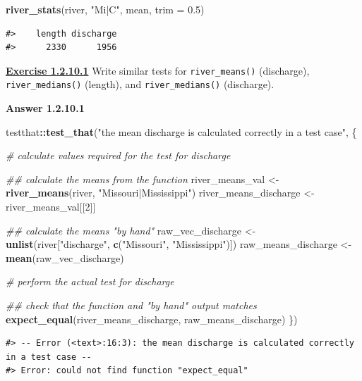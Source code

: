 \documentclass[
]{book}
\newenvironment{Shaded}{\begin{snugshade}}{\end{snugshade}}
\newcommand{\CommentTok}[1]{\textcolor[rgb]{0.56,0.35,0.01}{\textit{#1}}}
\newcommand{\DataTypeTok}[1]{\textcolor[rgb]{0.13,0.29,0.53}{#1}}
\newcommand{\DecValTok}[1]{\textcolor[rgb]{0.00,0.00,0.81}{#1}}
\newcommand{\FloatTok}[1]{\textcolor[rgb]{0.00,0.00,0.81}{#1}}
\newcommand{\KeywordTok}[1]{\textcolor[rgb]{0.13,0.29,0.53}{\textbf{#1}}}
\newcommand{\NormalTok}[1]{#1}
\newcommand{\OperatorTok}[1]{\textcolor[rgb]{0.81,0.36,0.00}{\textbf{#1}}}
\newcommand{\StringTok}[1]{\textcolor[rgb]{0.31,0.60,0.02}{#1}}
\begin{document}
\begin{Shaded}
\begin{Highlighting}[]
\KeywordTok{river_stats}\NormalTok{(river, }\StringTok{"Mi|C"}\NormalTok{, mean, }\DataTypeTok{trim =} \FloatTok{0.5}\NormalTok{)}
\end{Highlighting}
\end{Shaded}

\begin{verbatim}
#>    length discharge 
#>      2330      1956
\end{verbatim}

\textbf{\protect\hyperlink{ex-set4}{Exercise 1.2.10.1}} Write similar tests for \texttt{river\_means()} (discharge), \texttt{river\_medians()} (length), and \texttt{river\_medians()} (discharge).

\textbf{Answer 1.2.10.1}

\begin{Shaded}
\begin{Highlighting}[]
\NormalTok{testthat}\OperatorTok{::}\KeywordTok{test_that}\NormalTok{(}\StringTok{"the mean discharge is calculated correctly in a test case"}\NormalTok{, \{}
  
  \CommentTok{# calculate values required for the test for discharge}

  \CommentTok{## calculate the means from the function}
\NormalTok{  river_means_val <-}\StringTok{ }\KeywordTok{river_means}\NormalTok{(river, }\StringTok{"Missouri|Mississippi"}\NormalTok{)}
\NormalTok{  river_means_discharge <-}\StringTok{ }\NormalTok{river_means_val[[}\DecValTok{2}\NormalTok{]]}

  \CommentTok{## calculate the means "by hand"}
\NormalTok{  raw_vec_discharge <-}\StringTok{ }\KeywordTok{unlist}\NormalTok{(river[}\StringTok{"discharge"}\NormalTok{, }\KeywordTok{c}\NormalTok{(}\StringTok{"Missouri"}\NormalTok{, }\StringTok{"Mississippi"}\NormalTok{)])}
\NormalTok{  raw_means_discharge <-}\StringTok{ }\KeywordTok{mean}\NormalTok{(raw_vec_discharge)}
  
  \CommentTok{# perform the actual test for discharge}

  \CommentTok{## check that the function and "by hand" output matches}
  \KeywordTok{expect_equal}\NormalTok{(river_means_discharge, raw_means_discharge)}
\NormalTok{\})}
\end{Highlighting}
\end{Shaded}

\begin{verbatim}
#> -- Error (<text>:16:3): the mean discharge is calculated correctly in a test case --
#> Error: could not find function "expect_equal"
\end{verbatim}
\end{document}
